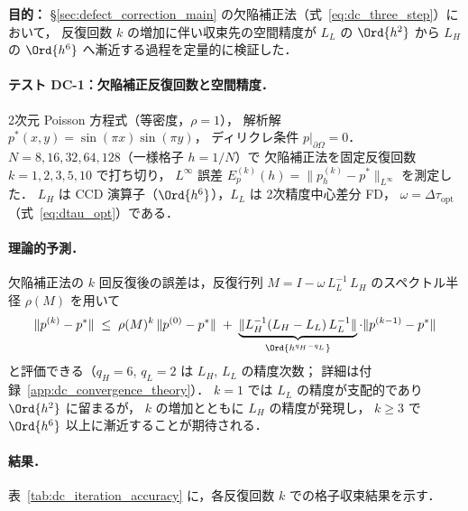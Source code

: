 %

\noindent\textbf{目的：}
§\ref{sec:defect_correction_main} の欠陥補正法（式~\eqref{eq:dc_three_step}）において，
反復回数 $k$ の増加に伴い収束先の空間精度が
$L_L$ の $\Ord{h^2}$ から $L_H$ の $\Ord{h^6}$ へ漸近する過程を定量的に検証した．

\paragraph{テスト DC-1：欠陥補正反復回数と空間精度．}
2次元 Poisson 方程式（等密度，$\rho = 1$），
解析解 $p^*(x,y) = \sin(\pi x)\sin(\pi y)$，
ディリクレ条件 $p|_{\partial\Omega} = 0$．
$N = 8, 16, 32, 64, 128$（一様格子 $h = 1/N$）で
欠陥補正法を固定反復回数 $k = 1, 2, 3, 5, 10$ で打ち切り，
$L^\infty$ 誤差 $E_p^{(k)}(h) = \|p_h^{(k)} - p^*\|_{L^\infty}$ を測定した．
$L_H$ は CCD 演算子（$\Ord{h^6}$），$L_L$ は 2次精度中心差分 FD，
$\omega = \Delta\tau_\mathrm{opt}$（式~\eqref{eq:dtau_opt}）である．

\paragraph{理論的予測．}

欠陥補正法の $k$ 回反復後の誤差は，反復行列
$M = I - \omega\,L_L^{-1}\,L_H$ のスペクトル半径 $\rho(M)$ を用いて
\begin{equation}
  \|p^{(k)} - p^*\|
  \;\leq\; \rho(M)^k\,\|p^{(0)} - p^*\|
  \;+\; \underbrace{\|L_H^{-1}(L_H - L_L)\,L_L^{-1}\|}_{\Ord{h^{q_H - q_L}}} \cdot \|p^{(k-1)} - p^*\|
  \label{eq:dc_error_bound}
\end{equation}
と評価できる（$q_H = 6$, $q_L = 2$ は $L_H$, $L_L$ の精度次数；
詳細は付録~\ref{app:dc_convergence_theory}）．
$k=1$ では $L_L$ の精度が支配的であり $\Ord{h^2}$ に留まるが，
$k$ の増加とともに $L_H$ の精度が発現し，
$k \geq 3$ で $\Ord{h^6}$ 以上に漸近することが期待される．

\paragraph{結果．}

表~\ref{tab:dc_iteration_accuracy} に，各反復回数 $k$ での格子収束結果を示す．

